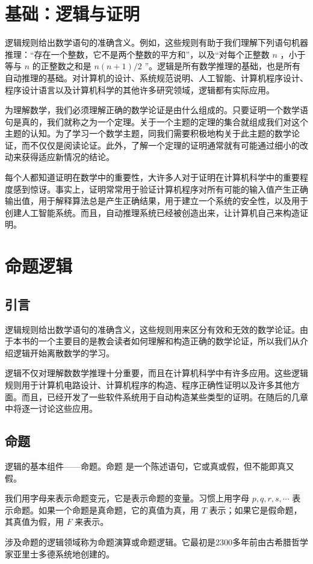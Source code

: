 \section{基础：逻辑与证明}
逻辑规则给出数学语句的准确含义。例如，这些规则有助于我们理解下列语句机器推理：“存在一个整数，它不是两个整数的平方和”，以及“对每个正整数
$n$
，小于等与
$n$
的正整数之和是
$n(n+1)/2$
”。逻辑是所有数学推理的基础，也是所有自动推理的基础。对计算机的设计、系统规范说明、人工智能、计算机程序设计、程序设计语言以及计算机科学的其他许多研究领域，逻辑都有实际应用。

为理解数学，我们必须理解正确的数学论证是由什么组成的。只要证明一个数学语句是真的，我们就称之为一个定理。关于一个主题的定理的集合就组成我们对这个主题的认知。为了学习一个数学主题，同我们需要积极地构关于此主题的数学论证，而不仅仅是阅读论证。此外，了解一个定理的证明通常就有可能通过细小的改动来获得适应新情况的结论。

每个人都知道证明在数学中的重要性，大许多人对于证明在计算机科学中的重要程度感到惊讶。事实上，证明常常用于验证计算机程序对所有可能的输入值产生正确输出值，用于解释算法总是产生正确结果，用于建立一个系统的安全性，以及用于创建人工智能系统。而且，自动推理系统已经被创造出来，让计算机自己来构造证明。
\section{命题逻辑}
\subsection{引言}
逻辑规则给出数学语句的准确含义，这些规则用来区分有效和无效的数学论证。由于本书的一个主要目的是教会读者如何理解和构造正确的数学论证，所以我们从介绍逻辑开始离散数学的学习。  

逻辑不仅对理解数数学推理十分重要，而且在计算机科学中有许多应用。这些逻辑规则用于计算机电路设计、计算机程序的构造、程序正确性证明以及许多其他方面。而且，已经开发了一些软件系统用于自动构造某些类型的证明。在随后的几章中将逐一讨论这些应用。

\subsection{命题}
逻辑的基本组件——命题。命题 是一个陈述语句，它或真或假，但不能即真又假。  

我们用字母来表示命题变元，它是表示命题的变量。习惯上用字母 
$p,q,r,s,\cdots$ 
表示命题。如果一个命题是真命题，它的真值为真，用
$T$
表示；如果它是假命题，其真值为假，用
$F$
来表示。  

涉及命题的逻辑领域称为命题演算或命题逻辑。它最初是2300多年前由古希腊哲学家亚里士多德系统地创建的。  

